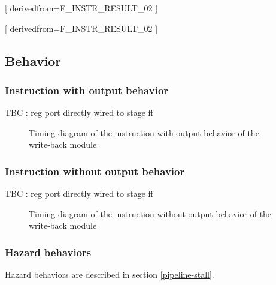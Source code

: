 [
  derivedfrom=F\_INSTR\_RESULT\_02
]

[
  derivedfrom=F\_INSTR\_RESULT\_02
]

\subsection{Behavior}

\subsubsection{Instruction with output behavior}

\begin{content}
  TBC : reg port directly wired to stage ff
\end{content}

\begin{figure}[H]
    \centering
    
    \caption{Timing diagram of the instruction with output behavior of the write-back module}
    \label{fig:wbm-behavior-instruction-with-output}
\end{figure}

\subsubsection{Instruction without output behavior}

\begin{content}
  TBC : reg port directly wired to stage ff
\end{content}

\begin{figure}[H]
    \centering
    
    \caption{Timing diagram of the instruction without output behavior of the write-back module}
    \label{fig:wbm-behavior-instruction-without-output}
\end{figure}

\subsubsection{Hazard behaviors}

\begin{content}
  Hazard behaviors are described in section \ref{pipeline-stall}.
\end{content}

\newpage
